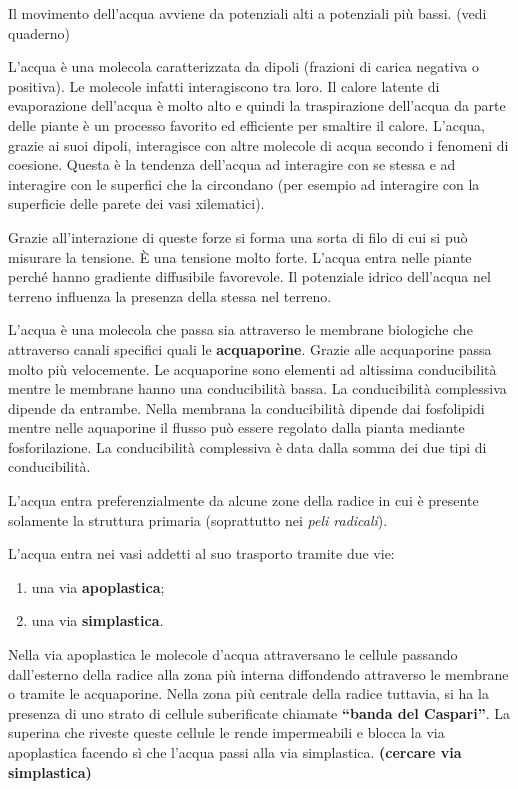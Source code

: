 \documentclass[]{article}
\begin{document}
Il movimento dell'acqua avviene da potenziali alti a potenziali più
bassi. (vedi quaderno)

L'acqua è una molecola caratterizzata da dipoli (frazioni di carica
negativa o positiva). Le molecole infatti interagiscono tra loro. Il
calore latente di evaporazione dell'acqua è molto alto e quindi la
traspirazione dell'acqua da parte delle piante è un processo favorito ed
efficiente per smaltire il calore. L'acqua, grazie ai suoi dipoli,
interagisce con altre molecole di acqua secondo i fenomeni di coesione.
Questa è la tendenza dell'acqua ad interagire con se stessa e ad
interagire con le superfici che la circondano (per esempio ad interagire
con la superficie delle parete dei vasi xilematici).

Grazie all'interazione di queste forze si forma una sorta di filo di cui
si può misurare la tensione. È una tensione molto forte. L'acqua entra
nelle piante perché hanno gradiente diffusibile favorevole. Il
potenziale idrico dell'acqua nel terreno influenza la presenza della
stessa nel terreno.

L'acqua è una molecola che passa sia attraverso le membrane biologiche
che attraverso canali specifici quali le \textbf{acquaporine}. Grazie
alle acquaporine passa molto più velocemente. Le acquaporine sono
elementi ad altissima conducibilità mentre le membrane hanno una
conducibilità bassa. La conducibilità complessiva dipende da entrambe.
Nella membrana la conducibilità dipende dai fosfolipidi mentre nelle
aquaporine il flusso può essere regolato dalla pianta mediante
fosforilazione. La conducibilità complessiva è data dalla somma dei due
tipi di conducibilità.

L'acqua entra preferenzialmente da alcune zone della radice in cui è
presente solamente la struttura primaria (soprattutto nei \emph{peli
radicali}).

L'acqua entra nei vasi addetti al suo trasporto tramite due vie:

\begin{enumerate}
\def\labelenumi{\arabic{enumi}.}
\itemsep1pt\parskip0pt
\item
  una via \textbf{apoplastica};
\item
  una via \textbf{simplastica}.
\end{enumerate}

Nella via apoplastica le molecole d'acqua attraversano le cellule
passando dall'esterno della radice alla zona più interna diffondendo
attraverso le membrane o tramite le acquaporine. Nella zona più centrale
della radice tuttavia, si ha la presenza di uno strato di cellule
suberificate chiamate \textbf{``banda del Caspari''}. La superina che
riveste queste cellule le rende impermeabili e blocca la via apoplastica
facendo sì che l'acqua passi alla via simplastica. \textbf{(cercare via
simplastica)}
\end{document}
